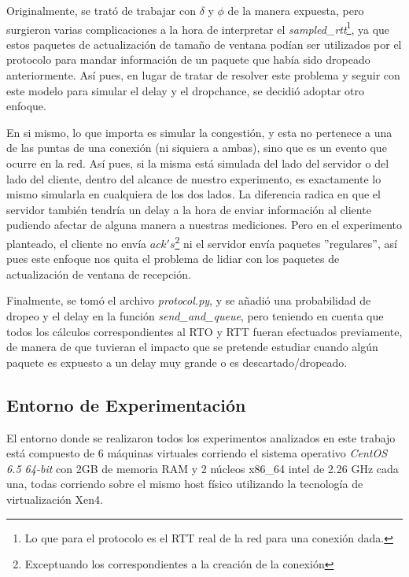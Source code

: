\par Originalmente, se trat\'o de trabajar con $\delta$ y $\phi$ de la manera
expuesta, pero surgieron varias complicaciones a la hora de interpretar el
\emph{sampled\_rtt}\footnote{Lo que para el protocolo es el RTT real de la red
para una conexi\'on dada.}, ya que estos paquetes de actualizaci\'on de tama\~no
de ventana pod\'ian ser utilizados por el protocolo para mandar informaci\'on de
un paquete que hab\'ia sido dropeado anteriormente. As\'i pues, en lugar de
tratar de resolver este problema y seguir con este modelo para simular el delay
y el dropchance, se decidi\'o adoptar otro enfoque.

\par En si mismo, lo que importa es simular la congesti\'on, y esta no pertenece
a una de las puntas de una conexi\'on (ni siquiera a ambas), sino que es un
evento que ocurre en la red. As\'i pues, si la misma est\'a simulada del lado
del servidor o del lado del cliente, dentro del alcance de nuestro experimento,
es exactamente lo mismo simularla en cualquiera de los dos lados.  La diferencia
radica en que el servidor tambi\'en tendr\'ia un delay a la hora de enviar
informaci\'on al cliente pudiendo afectar de alguna manera a nuestras
mediciones. Pero en el experimento planteado, el cliente no env\'ia
$ack's$\footnote{Exceptuando los correspondientes a la creaci\'on de la
conexi\'on} ni el servidor env\'ia paquetes ''regulares'', as\'i pues este
enfoque nos quita el problema de lidiar con los paquetes de actualizaci\'on de
ventana de recepci\'on.

\par Finalmente, se tom\'o el archivo \emph{protocol.py}, y se a\~nadi\'o una
probabilidad de dropeo y el delay en la funci\'on \emph{send\_and\_queue}, pero
teniendo en cuenta que todos los c\'alculos correspondientes al RTO y RTT fueran
efectuados previamente, de manera de que tuvieran el impacto que se pretende
estudiar cuando alg\'un paquete es expuesto a un delay muy grande o es
descartado/dropeado.


\subsection{Entorno de Experimentaci\'on}\label{sec:experimento:entorno}
\par El entorno donde se realizaron todos los experimentos analizados en este
trabajo est\'a compuesto de 6 m\'aquinas virtuales corriendo el sistema
operativo \textit{CentOS 6.5 64-bit}\cite{centos} con 2GB de memoria RAM y 2
n\'ucleos x86\_64 intel de 2.26 GHz cada una, todas corriendo sobre el mismo
host f\'isico utilizando la tecnolog\'ia de virtualizaci\'on Xen4\cite{xen}.

